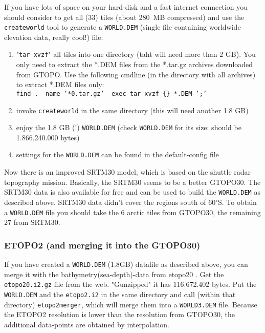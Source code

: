 If you have lots of space on your hard-disk and a fast internet connection you should consider to
get all (33) tiles (about 280~MB compressed) and use the \texttt{createworld}
tool to generate a \texttt{WORLD.DEM} (single file containing worldwide elevation data, really cool!) file:

\begin{enumerate}
\item "\texttt{tar xvzf}"  all tiles into one directory (taht will need more than 2 GB).
      You only need to extract the *.DEM files from the *.tar.gz archives
      downloaded from GTOPO. Use the following cmdline (in the directory with
      all archives) to extract *.DEM files only: \\
      \texttt{find . -name '*0.tar.gz' -exec tar xvzf \{\}  *.DEM ';'}

\item invoke \texttt{createworld} in the same directory (this will need another 1.8 GB)

\item enjoy the 1.8 GB (!) \texttt{WORLD.DEM} (check \texttt{WORLD.DEM} for its size:
      should be 1.866.240.000 bytes)

\item settings for the \texttt{WORLD.DEM} can be found in the default-config file

\end{enumerate}

Now there is an improved SRTM30 model, which is based on the shuttle radar topography
mission. Basically, the SRTM30 seems to be a better GTOPO30. The SRTM30 data is also available
for free  and can be used to build the \texttt{WORLD.DEM} as described above. SRTM30 data didn't cover
the regions south of 60$^\circ$S. To obtain a \texttt{WORLD.DEM} file you should take the 6 arctic
tiles from GTOPO30, the remaining 27 from SRTM30.


\subsubsection{ETOPO2 (and merging it into the GTOPO30)}
If you have created a \texttt{WORLD.DEM} (1.8GB) datafile as described above, you can merge it with the bathymetry(sea-depth)-data from etopo20 \cite{etopo2}.
Get the \texttt{etopo20.i2.gz} file from the web. "Gunzipped" it has 116.672.402 bytes.
Put the \texttt{WORLD.DEM} and the \texttt{etopo2.i2} in the same directory and call (within that directory) \texttt{etopo2merger}, which will merge them into a \texttt{WORLD3.DEM} file.
Because the ETOPO2 resolution is lower than the resolution from GTOPO30, the additional data-points are obtained by interpolation.


